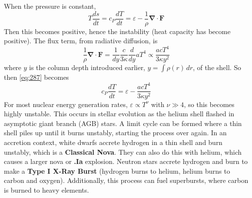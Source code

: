 \documentclass[10pt]{article}
\numberwithin{equation}{section}
\newcommand{\n}{\noindent}
\begin{document}
    \n When the pressure is constant, 
    \begin{equation}
      \label{eq:286}
      T\frac{ds}{dt}=c_P\frac{dT}{dt}=\varepsilon-\frac{1}{\rho}\bm{\nabla}
\cdot\mathbf{F}
    \end{equation}
    Then this becomes positive, hence the instability (heat capacity
    has become positive). The flux term, from radiative diffusion, is
    \begin{equation}
      \label{eq:287}
      \frac{1}{\rho}\bm{\nabla}\cdot\mathbf{F}=\frac{1}{dy}\frac{c}
{3\kappa}\frac{d}{dy}aT^4\propto
      \frac{ac T^4}{3\kappa y^2}
    \end{equation}
    where $y$ is the column depth introduced earlier, $y=\int
    \rho(r)\,dr$, of the shell. So then \eqref{eq:287} becomes
    \begin{equation}
      \label{eq:288}
      c_P\frac{dT}{dt}=\varepsilon-\frac{acT^4}{3\kappa y^2}
    \end{equation}
    For most nuclear energy generation rates, $\varepsilon\propto
    T^\nu$ with $\nu \gg 4$, so this becomes highly unstable. This
    occurs in stellar evolution as the helium shell flashed in
    asymptotic giant branch (AGB) stars. A limit cycle can be formed
    where a thin shell piles up until it burns unstably, starting the
    process over again. In an accretion context, white dwarfs accrete
    hydrogen in a thin shell and burn unstably, which is a
    \textbf{Classical Nova}. They can also do this with helium, which
    causes a larger nova or \textbf{.Ia} explosion. Neutron stars
    accrete hydrogen and burn to make a \textbf{Type I X-Ray Burst}
    (hydrogen burns to helium, helium burns to carbon and
    oxygen). Additionally, this process can fuel superbursts, where
    carbon is burned to heavy elements.\\
\end{document}
